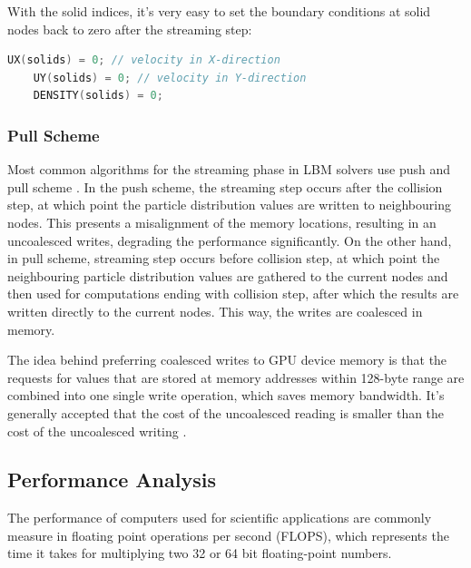 With the solid indices, it's very easy to set the boundary conditions at solid nodes back to zero after the streaming step:

\begin{lstlisting}[language=Cpp, caption=Pseudocode for boundary conditions at solid nodes.]
	UX(solids) = 0; // velocity in X-direction
	UY(solids) = 0; // velocity in Y-direction
	DENSITY(solids) = 0;
\end{lstlisting}

\subsubsection{Pull Scheme}

Most common algorithms for the streaming phase in LBM solvers use push and pull scheme \citep{tranPerformanceOptimization3D2017, herschlagGPUDataAccess2018}. In the push scheme, the streaming step occurs after the collision step, at which point the particle distribution values are written to neighbouring nodes. This presents a misalignment of the memory locations, resulting in an uncoalesced writes, degrading the performance significantly. On the other hand, in pull scheme, streaming step occurs before collision step, at which point the neighbouring particle distribution values are gathered to the current nodes and then used for computations ending with collision step, after which the results are written directly to the current nodes. This way, the writes are coalesced in memory.

The idea behind preferring coalesced writes to GPU device memory is that the requests for values that are stored at memory addresses within 128-byte range are combined into one single write operation, which saves memory bandwidth. It's generally accepted that the cost of the uncoalesced reading is smaller than the cost of the uncoalesced writing \citep{tranPerformanceOptimization3D2017}.


\subsection{Performance Analysis}\label{perf-analysis}
The performance of computers used for scientific applications are commonly measure in floating point operations per second (FLOPS), which represents the time it takes for multiplying two 32 or 64 bit floating-point numbers.

